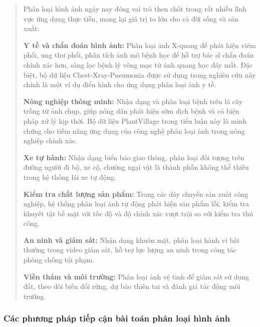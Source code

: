 \documentclass[
]{article}
\begin{document}
\begin{quote}
Phân loại hình ảnh ngày nay đóng vai trò then chốt trong rất nhiều lĩnh
vực ứng dụng thực tiễn, mang lại giá trị to lớn cho cả đời sống và sản
xuất:

\textbf{Y tế và chẩn đoán hình ảnh:} Phân loại ảnh X-quang để phát hiện
viêm phổi, ung thư phổi, phân tích ảnh mô bệnh học để hỗ trợ bác sĩ chẩn
đoán chính xác hơn, sàng lọc bệnh lý võng mạc từ ảnh quang học đáy mắt.
Đặc biệt, bộ dữ liệu Chest-Xray-Pneumonia được sử dụng trong nghiên cứu
này chính là một ví dụ điển hình cho ứng dụng phân loại ảnh y tế.

\textbf{Nông nghiệp thông minh:} Nhận dạng và phân loại bệnh trên lá cây
trồng từ ảnh chụp, giúp nông dân phát hiện sớm dịch bệnh và có biện pháp
xử lý kịp thời. Bộ dữ liệu PlantVillage trong tiểu luận này là minh
chứng cho tiềm năng ứng dụng của công nghệ phân loại ảnh trong nông
nghiệp chính xác.

\textbf{Xe tự hành:} Nhận dạng biển báo giao thông, phân loại đối tượng
trên đường người đi bộ, xe cộ, chướng ngại vật là thành phần không thể
thiếu trong hệ thống lái xe tự động.

\textbf{Kiểm tra chất lượng sản phẩm:} Trong các dây chuyền sản xuất
công nghiệp, hệ thống phân loại ảnh tự động phát hiện sản phẩm lỗi, kiểm
tra khuyết tật bề mặt với tốc độ và độ chính xác vượt trội so với kiểm
tra thủ công.

\textbf{An ninh và giám sát:} Nhận dạng khuôn mặt, phân loại hành vi bất
thường trong video giám sát, hỗ trợ lực lượng an ninh trong công tác
phòng chống tội phạm.

\textbf{Viễn thám và môi trường:} Phân loại ảnh vệ tinh để giám sát sử
dụng đất, theo dõi biến đổi rừng, dự báo thiên tai và đánh giá tác động
môi trường.
\end{quote}

\hypertarget{cuxe1c-phux1b0ux1a1ng-phuxe1p-tiux1ebfp-cux1eadn-buxe0i-touxe1n-phuxe2n-loux1ea1i-huxecnh-ux1ea3nh}{%
\subsubsection{Các phương pháp tiếp cận bài toán phân loại hình
ảnh}\label{cuxe1c-phux1b0ux1a1ng-phuxe1p-tiux1ebfp-cux1eadn-buxe0i-touxe1n-phuxe2n-loux1ea1i-huxecnh-ux1ea3nh}}
\end{document}
